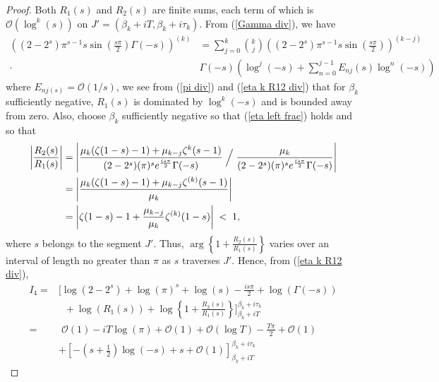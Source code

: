 \documentclass{amsart}
\theoremstyle{plain}
\theoremstyle{definition}
\begin{document}
\begin{proof}
Both $R_1(s)$ and $R_2(s)$ are finite sums, each term of which is $\mathcal{O}(\log^k(s))$ on $J'=(\beta_k+iT,\beta_k+i\tau_k)$. From (\ref{Gamma div}), we have 
\begin{align*}
    \left((2-2^{s})\pi^{s-1}s\sin\left(\frac{s\pi}{2}\right)\Gamma(-s)\right)^{(k)}\!\!\!&= \sum\limits_{j=0}^{k}\binom{k}{j}\left((2-2^{s})\pi^{s-1}s\sin\left(\frac{s\pi}{2}\right)\right)^{(k-j)}\\\cdot\;&\Gamma(-s)\left(\log^j(-s)+\sum\limits_{n=0}^{j-1}E_{nj}(s)\log^n(-s)\right)
\end{align*}
where $E_{nj(s)}=\mathcal{O}(1/s)$, we see from (\ref{pi div}) and (\ref{eta k R12 div}) that for $\beta_k$ sufficiently negative, $R_1(s)$ is dominated by $\log^k(-s)$ and is bounded away from zero. Also, choose $\beta_k$ sufficiently negative so that (\ref{eta left frac}) holds and so that 
\begin{align*}
    \left|\frac{R_2(s)}{R_1(s)}\right|
    &=\left|\frac{\mu_{k}(\zeta(1-s)-1)+\mu_{k-j}\zeta^{k}(s-1)}{(2-2^{s})(\pi)^se^{\frac{is\pi}{2}}\Gamma(-s)}\Bigm/\frac{\mu_{k}}{(2-2^{s})(\pi)^se^{\frac{is\pi}{2}}\Gamma(-s)}\right|\\
    &=\left|\frac{\mu_k(\zeta(1-s)-1)+\mu_{k-j}\zeta^{(k)}(s-1)}{\mu_k}\right|\\ 
    &=  \left|\zeta(1-s)-1+\frac{\mu_{k-j}}{\mu_{k}}\zeta^{(k)}(1-s)\right| \; < \; 1, 
\end{align*}
where $s$ belongs to the segment $J'$. Thus, $\arg\left\{1+\frac{R_2(s)}{R_{1}(s)}\right\}$ varies over an interval of length no greater than $\pi$ as $s$ traverses $J'$. Hence, from (\ref{eta k R12 div}), 
\begin{align*}
    I_4 = &\Bigg[\log(2-2^s)+\log(\pi)^s+\log(s)-\frac{i s\pi}{2}+\log(\Gamma(-s))\\ 
    &\;\;+\log(R_1(s))+\log\left\{1+\frac{R_2(s)}{R_1(s)}\right\}\Bigg]_{\beta_k+iT}^{\beta_k+i\tau_k}\\
    =&\;\mathcal{O}(1)-iT\log(\pi) +\mathcal{O}(1)+\mathcal{O}(\log T)-\frac{T\pi}{2}+\mathcal{O}(1) \\
    &+\left[-(s+\frac{1}{2})\log(-s)+s+\mathcal{O}(1) \right]_{\beta_k+iT}^{\beta_k+i\tau_k} 

\end{align*}
\end{proof}
\end{document}
